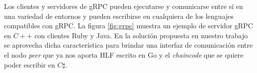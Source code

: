 Los clientes y servidores de gRPC pueden ejecutarse y comunicarse entre sí en una variedad de entornos y pueden escribirse en cualquiera de los lenguajes compatibles con gRPC. La figura \ref{fig:grpc} muestra un ejemplo de servidor gRPC en $ C++ $ con clientes Ruby y Java. En la solución propuesta en nuestro trabajo se aprovecha dicha característica para brindar una interfaz de comunicación entre el nodo \textit{peer} que ya nos aporta HLF escrito en Go y el \textit{chaincode} que se quiere poder escribir en $ C\sharp$.








